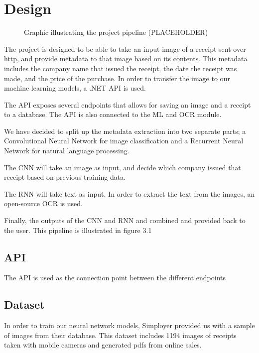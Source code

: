 \chapter{Design}
\label{ch:design}

\begin{figure}[h]
    \caption{Graphic illustrating the project pipeline (PLACEHOLDER)}
    \label{fig:figure3}
\end{figure}
The project is designed to be able to take an input image of a receipt sent over http, and provide metadata to that image based on its contents.
This metadata includes the company name that issued the receipt, the date the receipt was made, and the price of the purchase.
In order to transfer the image to our machine learning models, a .NET API is used.

The API exposes several endpoints that allows for saving an image and a receipt to a database.
The API is also connected to the ML and OCR module.

We have decided to split up the metadata extraction into two separate parts;
a Convolutional Neural Network for image classification and a Recurrent Neural Network for natural language processing.

The CNN will take an image as input, and decide which company issued that receipt based on previous training data.

The RNN will take text as input.
In order to extract the text from the images, an open-source OCR is used.

Finally, the outputs of the CNN and RNN and combined and provided back to the user.
This pipeline is illustrated in figure 3.1

\section{API}\label{sec:API}
The API is used as the connection point between the different endpoints

\section{Dataset}\label{sec:dataset}
In order to train our neural network models, Simployer provided us with a sample of images from their database.
This dataset includes 1194 images of receipts taken with mobile cameras and generated pdfs from online sales.

